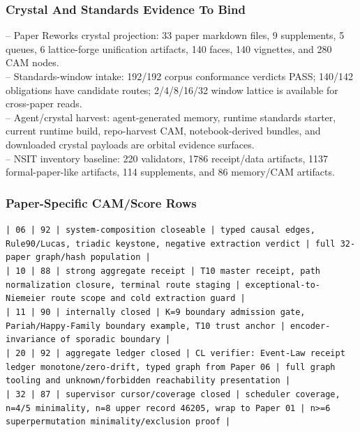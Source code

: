 \documentclass[11pt]{article}
\begin{document}
\subsubsection*{Crystal And Standards Evidence To Bind}

\noindent{}-- Paper Reworks crystal projection: 33 paper markdown files, 9 supplements, 5 queues, 6 lattice-forge unification artifacts, 140 faces, 140 vignettes, and 280 CAM nodes.\\
\noindent{}-- Standards-window intake: 192/192 corpus conformance verdicts PASS; 140/142 obligations have candidate routes; 2/4/8/16/32 window lattice is available for cross-paper reads.\\
\noindent{}-- Agent/crystal harvest: agent-generated memory, runtime standards starter, current runtime build, repo-harvest CAM, notebook-derived bundles, and downloaded crystal payloads are orbital evidence surfaces.\\
\noindent{}-- NSIT inventory baseline: 220 validators, 1786 receipt/data artifacts, 1137 formal-paper-like artifacts, 114 supplements, and 86 memory/CAM artifacts.\\

\subsubsection*{Paper-Specific CAM/Score Rows}

\noindent\texttt{| 06 | 92 | system-composition closeable | typed causal edges, Rule90/Lucas, triadic keystone, negative extraction verdict | full 32-paper graph/hash population |}\\
\noindent\texttt{| 10 | 88 | strong aggregate receipt | T10 master receipt, path normalization closure, terminal route staging | exceptional-to-Niemeier route scope and cold extraction guard |}\\
\noindent\texttt{| 11 | 90 | internally closed | K=9 boundary admission gate, Pariah/Happy-Family boundary example, T10 trust anchor | encoder-invariance of sporadic boundary |}\\
\noindent\texttt{| 20 | 92 | aggregate ledger closed | CL verifier: Event-Law receipt ledger monotone/zero-drift, typed graph from Paper 06 | full graph tooling and unknown/forbidden reachability presentation |}\\
\noindent\texttt{| 32 | 87 | supervisor cursor/coverage closed | scheduler coverage, n=4/5 minimality, n=8 upper record 46205, wrap to Paper 01 | n>=6 superpermutation minimality/exclusion proof |}\\
\end{document}
